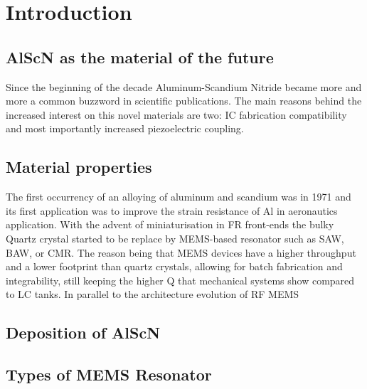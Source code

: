 \cleardoublepage
\chapter{Introduction}

\section{AlScN as the material of the future}
Since the beginning of the decade Aluminum-Scandium Nitride became more and more a common buzzword in scientific publications. The main reasons behind the increased interest on this novel materials are two: IC fabrication compatibility and most importantly increased piezoelectric coupling. 


\section{Material properties }
The first occurrency of an alloying of aluminum and scandium was in 1971 \cite{caro_piezoelectric_2015} and its first application was to improve the strain resistance of Al in aeronautics application. With the advent of miniaturisation in FR front-ends the bulky Quartz crystal started to be replace by MEMS-based resonator such as SAW, BAW, or CMR. The reason being that MEMS devices have a higher throughput and a lower footprint than quartz crystals, allowing for batch fabrication and integrability, still keeping the higher Q that mechanical systems show compared to LC tanks. In parallel to the architecture evolution of RF MEMS 

\section{Deposition of AlScN}
\section{Types of MEMS Resonator}
